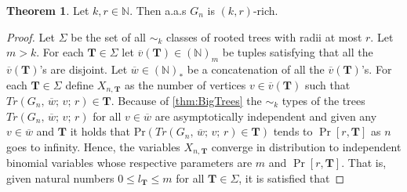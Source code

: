 \documentclass[12pt,notitlepage,a4paper]{article}
\theoremstyle{definition}
\newtheorem{theorem}{Theorem}[section]
\newcommand{\N}{\mathbb{N}}
\begin{document}
\begin{theorem}\label{thm:rich}
	Let $k,r\in \N$. Then a.a.s $G_n$ is $(k,r)$-rich.
\end{theorem}
\begin{proof}
	Let $\Sigma$ be the set of all $\sim_k$ classes of rooted trees
	with radii at most $r$. Let $m>k$. 
	For each $\mathbf{T}\in \Sigma$
	let $\overline{v}(\mathbf{T})\in (\N)_m$ be tuples
	satisfying 
	that all the $\overline{v}(\mathbf{T})$'s are
	disjoint. Let $\overline{w}\in (\N)_*$ be a concatenation
	of all the $\overline{v}(\mathbf{T})$'s. 
	For each $\mathbf{T}\in 
	\Sigma$ define $X_{n,\mathbf{T}}$ as the number of
	vertices $v\in \overline{v}(\mathbf{T})$ such that 
	$Tr(G_n,\,\overline{w};\,v;\,r)\in \mathbf{T}$. Because of \cref{thm:BigTrees}
	the $\sim_k$ types of the trees $Tr(G_n,\,\overline{w};\,v;\,r)$ 
	for all $v\in \overline{w}$ are asymptotically 
	independent and given any $v\in \overline{w}$ and
	$\mathbf{T}$ it holds that $\mathrm{Pr}(Tr(G_n,\,\overline{w};\,v;\,r)\in \mathbf{T})$
	tends to $\Pr[r,\mathbf{T}]$ as $n$ goes to infinity. 
	Hence,	the variables $X_{n,\mathbf{T}}$ converge in distribution to 
	independent binomial variables whose respective parameters are
	$m$ and $\Pr[r,\mathbf{T}]$. That is, given natural numbers
	$0\leq l_\mathbf{T} \leq m$ for all $\mathbf{T}\in \Sigma$, it is
	satisfied that


\end{proof}
\end{document}
